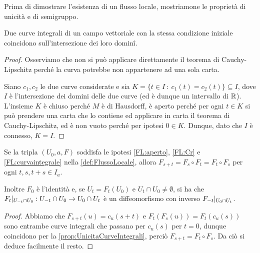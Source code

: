 Prima di dimostrare l'esistenza di un flusso locale, mostriamone le proprietà di unicità e di semigruppo.
 
\begin{proposition} \label{prop:UnicitaCurveIntegrali}
	Due curve integrali di un campo vettoriale con la stessa condizione iniziale coincidono sull'intersezione dei loro dominî.
\end{proposition}

\begin{proof}
	Osserviamo che non si può applicare direttamente il teorema di Cauchy-Lipschitz perché la curva potrebbe non appartenere ad una sola carta.
	
	Siano $c_1,c_2$ le due curve considerate e sia $K=\{ t\in I\ : \ c_1(t)=c_2(t)\}\subseteq I$, dove $I$ è l'intersezione dei domini delle due curve (ed è dunque un intervallo di $\mathbb R$). L'insieme $K$ è chiuso perché $M$ è di Hausdorff, è aperto perché per ogni $t\in K$ si può prendere una carta che lo contiene ed applicare in carta il teorema di Cauchy-Lipschitz, ed è non vuoto perché per ipotesi $0\in K$. Dunque, dato che $I$ è connesso, $K=I$.
\end{proof}

\begin{proposition}
	Se la tripla $(U_0,a,F)$ soddisfa le ipotesi \ref{FL:aperto}, \ref{FL:Cr} e \ref{FL:curvaintegrale} nella \cref{def:FlussoLocale}, allora $F_{s+t}=F_s\circ F_t=F_t\circ F_s$ per ogni $t,s,t+s\in I_a$.
	
	Inoltre $F_0$ è l'identità e, se $U_t=F_t(U_0)$ e $U_t\cap U_0\ne\emptyset$, si ha che $F_t|_{U_{-t}\cap U_0}:U_{-t}\cap U_0\to U_0\cap U_t$ è un diffeomorfismo con inverso $F_{-t}|_{U_0\cap U_t}$.
\end{proposition}

\begin{proof}
	Abbiamo che $F_{s+t}(u)=c_u(s+t)$ e $F_t(F_s(u))=F_t(c_u(s))$ sono entrambe curve integrali che passano per $c_u(s)$ per $t=0$, dunque coincidono per la \cref{prop:UnicitaCurveIntegrali}, perciò $F_{s+t}=F_t\circ F_s$. Da ciò si deduce facilmente il resto.
\end{proof}


